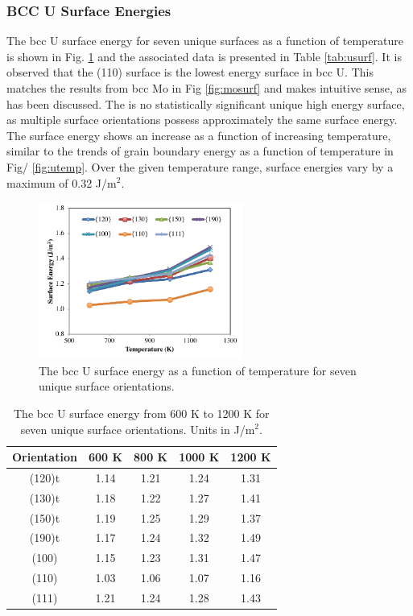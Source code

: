 \documentclass[review]{elsarticle}
\begin{document}
\FloatBarrier


\subsubsection{BCC U Surface Energies}

The bcc U surface energy for seven unique surfaces as a function of temperature is shown in Fig. \ref{fig:usurf} and the associated data is presented in Table \ref{tab:usurf}. It is observed that the (110) surface is the lowest energy surface in bcc U. This matches the results from bcc Mo in Fig \ref{fig:mosurf} and makes intuitive sense, as has been discussed. The is no statistically significant unique high energy surface, as multiple surface orientations possess approximately the same surface energy. The surface energy shows an increase as a function of increasing temperature, similar to the trends of grain boundary energy as a function of temperature in Fig/ \ref{fig:utemp}. Over the given temperature range, surface energies vary by a maximum of 0.32 J/m$^{2}$.

\begin{figure}[h]
 \centering
 \includegraphics[width=0.6\textwidth]{usurf.png} 
 \caption{The bcc U surface energy as a function of temperature for seven unique surface orientations.}
 \label{fig:usurf}
\end{figure}

\begin{table}[h]
\caption{The bcc U surface energy from 600 K to 1200 K for seven unique surface orientations. Units in J/m$^{2}$. } \label{tab:usurf}
\begin{center}
\begin{tabular}{|c|c|c|c|c|}
	\hline
	Orientation & 600 K & 800 K & 1000 K & 1200 K \\
	 \hline
	 (120)t & 1.14 & 1.21 & 1.24 & 1.31 \\
	 (130)t & 1.18 & 1.22 & 1.27 & 1.41 \\
	 (150)t & 1.19 & 1.25 & 1.29 & 1.37 \\
	 (190)t & 1.17 & 1.24 & 1.32 & 1.49 \\
         (100) & 1.15 & 1.23 & 1.31 & 1.47 \\
	 (110) & 1.03 & 1.06 & 1.07 & 1.16 \\
	 (111) & 1.21 & 1.24 & 1.28 & 1.43 \\	 
	 \hline
\end{tabular}
\end{center}
\label{default}
\end{table}
\end{document}
